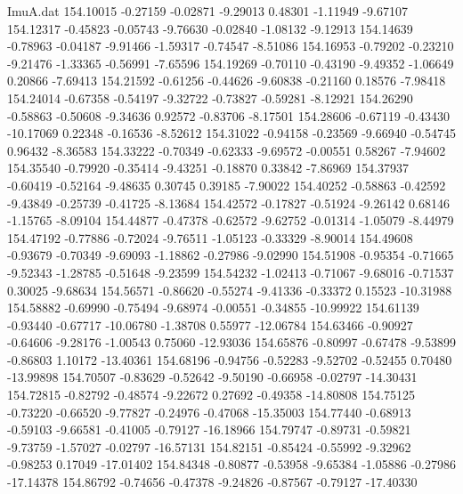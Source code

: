\begin{filecontents}{ImuA.dat}
 154.10015   -0.27159   -0.02871   -9.29013    0.48301   -1.11949   -9.67107
 154.12317   -0.45823   -0.05743   -9.76630   -0.02840   -1.08132   -9.12913
 154.14639   -0.78963   -0.04187   -9.91466   -1.59317   -0.74547   -8.51086
 154.16953   -0.79202   -0.23210   -9.21476   -1.33365   -0.56991   -7.65596
 154.19269   -0.70110   -0.43190   -9.49352   -1.06649    0.20866   -7.69413
 154.21592   -0.61256   -0.44626   -9.60838   -0.21160    0.18576   -7.98418
 154.24014   -0.67358   -0.54197   -9.32722   -0.73827   -0.59281   -8.12921
 154.26290   -0.58863   -0.50608   -9.34636    0.92572   -0.83706   -8.17501
 154.28606   -0.67119   -0.43430  -10.17069    0.22348   -0.16536   -8.52612
 154.31022   -0.94158   -0.23569   -9.66940   -0.54745    0.96432   -8.36583
 154.33222   -0.70349   -0.62333   -9.69572   -0.00551    0.58267   -7.94602
 154.35540   -0.79920   -0.35414   -9.43251   -0.18870    0.33842   -7.86969
 154.37937   -0.60419   -0.52164   -9.48635    0.30745    0.39185   -7.90022
 154.40252   -0.58863   -0.42592   -9.43849   -0.25739   -0.41725   -8.13684
 154.42572   -0.17827   -0.51924   -9.26142    0.68146   -1.15765   -8.09104
 154.44877   -0.47378   -0.62572   -9.62752   -0.01314   -1.05079   -8.44979
 154.47192   -0.77886   -0.72024   -9.76511   -1.05123   -0.33329   -8.90014
 154.49608   -0.93679   -0.70349   -9.69093   -1.18862   -0.27986   -9.02990
 154.51908   -0.95354   -0.71665   -9.52343   -1.28785   -0.51648   -9.23599
 154.54232   -1.02413   -0.71067   -9.68016   -0.71537    0.30025   -9.68634
 154.56571   -0.86620   -0.55274   -9.41336   -0.33372    0.15523  -10.31988
 154.58882   -0.69990   -0.75494   -9.68974   -0.00551   -0.34855  -10.99922
 154.61139   -0.93440   -0.67717  -10.06780   -1.38708    0.55977  -12.06784
 154.63466   -0.90927   -0.64606   -9.28176   -1.00543    0.75060  -12.93036
 154.65876   -0.80997   -0.67478   -9.53899   -0.86803    1.10172  -13.40361
 154.68196   -0.94756   -0.52283   -9.52702   -0.52455    0.70480  -13.99898
 154.70507   -0.83629   -0.52642   -9.50190   -0.66958   -0.02797  -14.30431
 154.72815   -0.82792   -0.48574   -9.22672    0.27692   -0.49358  -14.80808
 154.75125   -0.73220   -0.66520   -9.77827   -0.24976   -0.47068  -15.35003
 154.77440   -0.68913   -0.59103   -9.66581   -0.41005   -0.79127  -16.18966
 154.79747   -0.89731   -0.59821   -9.73759   -1.57027   -0.02797  -16.57131
 154.82151   -0.85424   -0.55992   -9.32962   -0.98253    0.17049  -17.01402
 154.84348   -0.80877   -0.53958   -9.65384   -1.05886   -0.27986  -17.14378
 154.86792   -0.74656   -0.47378   -9.24826   -0.87567   -0.79127  -17.40330

\end{filecontents}
